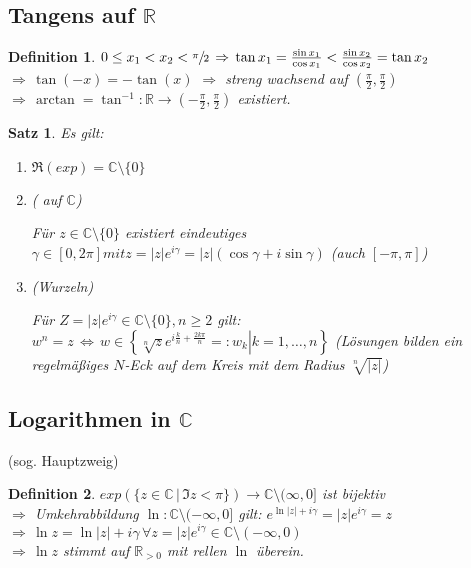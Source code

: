\documentclass[ngerman,a4paper]{report}
\theoremstyle{break}
\newtheorem{satz}[theorem]{Satz}
\newtheorem*{definition}{Definition}
\begin{document}
\subsection*{Tangens auf $\mathbb{R}$}
\begin{definition}
	$0 \le x_1 < x_2 < \sfrac{\pi}{2} \,\Rightarrow\,\tan x_1 = \frac{\sin x_1}{\cos x_1} < \frac{\sin x_2}{\cos x_2} = \tan x_2$ \\
	$\Rightarrow\,\tan (-x) = - \tan(x) $ $\Rightarrow$ streng wachsend auf $\left( \frac{\pi}{2},\frac{\pi}{2}\right)$ \\
	$\Rightarrow\,\arctan = \tan^{-1}: \mathbb{R}\to \left(-\frac{\pi}{2},\frac{\pi}{2}\right)$ existiert.
\end{definition}
\begin{satz}
	Es gilt:
	\begin{enumerate}[label={\arabic*)}]
		\item $\Re(exp) = \mathbb{C}\setminus\{0\}$
		\item ( auf $\mathbb{C}$)
		
		Für $z\in\mathbb{C}\setminus\{0\}$ existiert eindeutiges $\gamma\in[0,2\pi] mit z = |z|e^{i\gamma} = |z|\left( \cos \gamma + i\sin \gamma\right)$ (auch $[-\pi,\pi]$)
		\item (Wurzeln)
		
		Für $Z=|z|e^{i\gamma}\in\mathbb{C}\setminus\{0\}, n\ge 2$ gilt:\\
		$w^n = z \,\Leftrightarrow\, w\in\left\{ \left. \sqrt[n]{z} e^{i \frac{k}{n} + \frac{2k\pi}{n}} =: w_k \right| k=1,\dotsc,n\right\}$ (Lösungen bilden ein regelmäßiges $N$-Eck auf dem Kreis mit dem Radius $\sqrt[n]{|z|}$)
	\end{enumerate}
\end{satz}

\subsection*{Logarithmen in $\mathbb{C}$} (sog. Hauptzweig)
\begin{definition}
	$exp\left( \{ z\in\mathbb{C}\,|\, \Im z < \pi \}\right) \to \mathbb{C}\setminus (\infty, 0]$ ist bijektiv \\
	$\Rightarrow$ Umkehrabbildung $\ln:\mathbb{C}\setminus(-\infty,0]$ gilt: $e^{\ln |z| + i\gamma} = |z|e^{i\gamma} = z$\\
	$\Rightarrow\,\ln z = \ln |z| + i\gamma \,\forall z=|z|e^{i\gamma}\in\mathbb{C}\setminus(-\infty,0)$\\
	$\Rightarrow \,\ln z$ stimmt auf $\mathbb{R}_{>0}$ mit rellen $\ln$ überein.
\end{definition}
\end{document}
